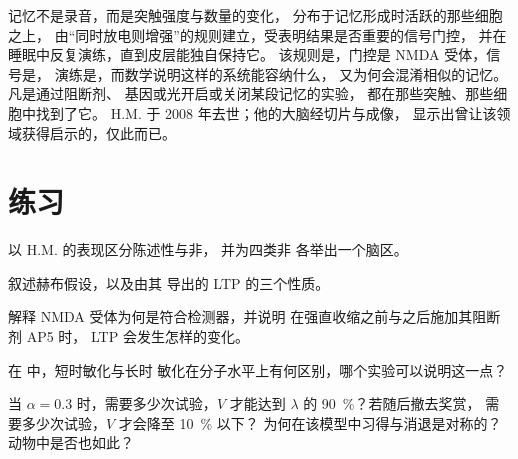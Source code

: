 \begin{remark}[记忆由什么构成]\label{rem:b3:learning-memory:what}
记忆不是录音，而是突触强度与数量的变化，
分布于记忆形成时活跃的那些细胞之上，
由“同时放电则增强”的规则建立，受表明结果是否重要的信号门控，
并在睡眠中反复演练，直到皮层能独自保持它。
该规则是，门控是 NMDA 受体，信号是，
演练是，而数学说明这样的系统能容纳什么，
又为何会混淆相似的记忆。凡是通过阻断剂、
基因或光开启或关闭某段记忆的实验，
都在那些突触、那些细胞中找到了它。
H.M. 于 2008 年去世；他的大脑经切片与成像，
显示出曾让该领域获得启示的，仅此而已。
\end{remark}

\section{练习}

\begin{exercise}[$\star$]\label{exo:b3:learning-memory:1}
以 H.M. 的表现区分陈述性与非，
并为四类非
各举出一个脑区。
\end{exercise}

\begin{exercise}[$\star$]\label{exo:b3:learning-memory:2}
叙述赫布假设，以及由其
导出的 LTP 的三个性质。
\end{exercise}

\begin{exercise}[$\star$]\label{exo:b3:learning-memory:3}
解释 NMDA 受体为何是符合检测器，并说明
在强直收缩之前与之后施加其阻断剂 AP5 时，
LTP 会发生怎样的变化。
\end{exercise}

\begin{exercise}[$\star$]\label{exo:b3:learning-memory:4}
在 \emph{} 中，短时敏化与长时
敏化在分子水平上有何区别，哪个实验可以说明这一点？
\end{exercise}

\begin{exercise}[$\star\star$]\label{exo:b3:learning-memory:5}
当 $\alpha = 0.3$ 时，需要多少次试验，$V$
才能达到 $\lambda$ 的 \qty{90}{\%}？若随后撤去奖赏，
需要多少次试验，$V$ 才会降至 \qty{10}{\%} 以下？
为何在该模型中习得与消退是对称的？动物中是否也如此？
\end{exercise}

